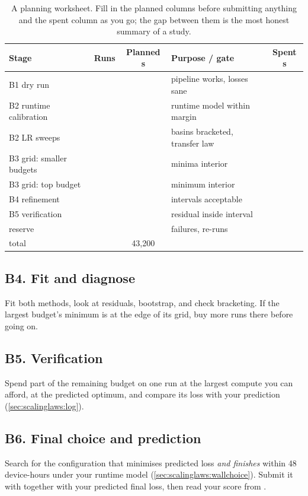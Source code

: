 \begin{table}[h]
\centering\small
\begin{tabularx}{\linewidth}{@{}lccXc@{}}
\toprule
\textbf{Stage} & \textbf{Runs} & \textbf{Planned s} & \textbf{Purpose / gate} & \textbf{Spent s}\\
\midrule
B1 dry run & & & pipeline works, losses sane & \\
B2 runtime calibration & & & runtime model within margin & \\
B2 LR sweeps & & & basins bracketed, transfer law & \\
B3 grid: smaller budgets & & & minima interior & \\
B3 grid: top budget & & & minimum interior & \\
B4 refinement & & & intervals acceptable & \\
B5 verification & & & residual inside interval & \\
reserve & & & failures, re-runs & \\
\midrule
total & & 43{,}200 & & \\
\bottomrule
\end{tabularx}
\caption{A planning worksheet. Fill in the planned columns before submitting anything and the
spent column as you go; the gap between them is the most honest summary of a study.}
\label{tab:proj3:worksheet}
\end{table}

\subsection*{B4. Fit and diagnose}
Fit both methods, look at residuals, bootstrap, and check bracketing. If the largest budget's
minimum is at the edge of its grid, buy more runs there before going on.

\subsection*{B5. Verification}
Spend part of the remaining budget on one run at the largest compute you can afford, at the
predicted optimum, and compare its loss with your prediction (\cref{sec:scalinglaws:log}).

\subsection*{B6. Final choice and prediction}
Search for the configuration that minimises predicted loss \emph{and finishes} within 48
device-hours under your runtime model (\cref{sec:scalinglaws:wallchoice}). Submit it with
 together with your predicted final loss, then read your score from
.

